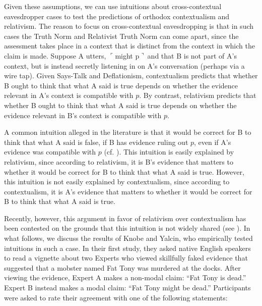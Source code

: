 \documentclass[11pt]{article}
\newcommand{\ul}{$\ulcorner$}
\newcommand{\ur}{$\urcorner\ $}
\begin{document}
\begin{doublespace}
Given these assumptions, we can use intuitions about cross-contextual eavesdropper cases to test the predictions of orthodox contextualism and relativism. The reason to focus on cross-contextual eavesdropping is that in such cases the {\sc Truth Norm} and {\sc Relativist Truth Norm} can come apart, since the assessment takes place in a context that is distinct from the context in which the claim is made. Suppose A utters, \ul might p\ur and that B is not part of A's context, but is instead secretly listening in on A's conversation (perhaps via a wire tap). Given {\sc Says-Talk} and {\sc Deflationism}, contextualism predicts that whether B ought to think that what A said is true depends on whether the evidence relevant in A's context is compatible with $p$. By contrast, relativism  predicts that whether B ought to think that what A said is true depends on whether the evidence relevant in B's context is compatible with $p$. 

A common intuition alleged in the literature is that it would be correct for B to think that what A said is false, if B has evidence ruling out $p$, even if A's evidence was compatible with $p$ (cf. \citealt{egan:2005, egan:2007, macfarlane:2011a, macfarlane:2014a}). This intuition is easily explained by relativism, since according to relativism, it is B's evidence that matters to whether it would be correct for B to think that what A said is true. However, this intuition is not easily explained by contextualism, since according to contextualism, it is A's evidence that matters to whether it would be correct for B to think that what A said is true.%

Recently, however, this argument in favor of relativism over contextualism has been contested on the grounds that this intuition is not widely shared (see \citealt{dowell:2011, yalcinknobe:2014}). In what follows, we discuss the results of Knobe and Yalcin, who empirically tested intuitions in such a case. In their first study, they asked native English speakers to read a vignette about two Experts who viewed skillfully faked evidence that suggested that a mobster named Fat Tony was murdered at the docks. After viewing the evidence, Expert A makes a non-modal claim: ``Fat Tony is dead.'' Expert B instead makes a modal claim: ``Fat Tony might be dead.'' Participants were asked to rate their agreement with one of the following statements: 


\end{doublespace}
\end{document}
